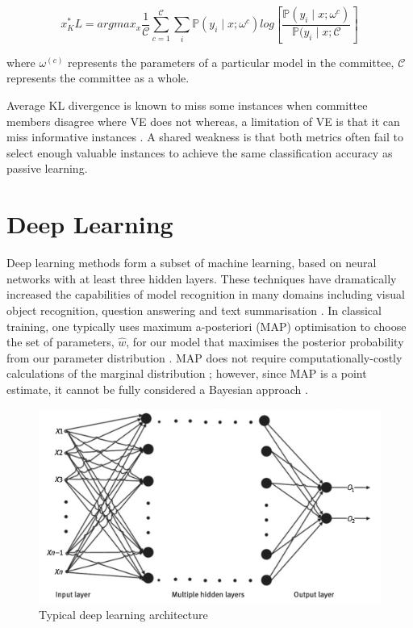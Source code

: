 \documentclass[ %
                    author={James Stephenson},
                supervisor={Dr. Edwin Simpson},
                    degree={MSc},
                     title={Project Plan: Bayesian Deep Learning For Extractive Test Summarisation},
                  subtitle={},
                      type={},
                      year={2022}]{../additions/dissertation}
\begin{document}
		$$
			x^\ast_KL = argmax_x \frac{1}{\mathcal{C}} \sum_{c=1}^{\mathcal{C}} \sum_i \mathbb{P}(y_i \mid x; \omega^{c}) log \left[\frac{\mathbb{P}(y_i \mid x; \omega^{c})}{\mathbb{P}(y_i \mid x; \mathcal{C}}\right]
		$$

\noindent
where $\omega^{(c)}$ represents the parameters of a particular model in the committee, $\mathcal{C}$ represents the committee as a whole.

\medbreak
Average KL divergence is known to miss some instances when committee members disagree where VE does not whereas, a limitation of VE is that it can miss informative instances \cite{Li06}. A shared weakness is that both metrics often fail to select enough valuable instances to achieve the same classification accuracy as passive learning.

		
		
		\section{Deep Learning}
		\label{chap:literaturereview:deep}
		
		Deep learning methods form a subset of machine learning, based on neural networks with at least three hidden layers. These techniques have dramatically increased the capabilities of model recognition in many domains including visual object recognition, question answering and text summarisation \cite{Lecun15, Sharma18, Azar17}. In classical training, one typically uses maximum a-posteriori (MAP) optimisation to choose the set of parameters, $\hat{w}$, for our model that maximises the posterior probability from our parameter distribution \cite{Wilson20}. MAP does not require computationally-costly calculations of the marginal distribution \cite{Hero15}; however, since MAP is a point estimate, it cannot be fully considered a Bayesian approach \cite{Hero15}.

		\begin{figure}
			\centering
			\includegraphics[width=0.5\linewidth]{../additions/figures/Bhattacharyya20_plot_Deep}
			\caption{Typical deep learning architecture \cite{Bhattacharyya20}}
			\label{fig:deep_architecture}
		\end{figure}
		
\end{document}
